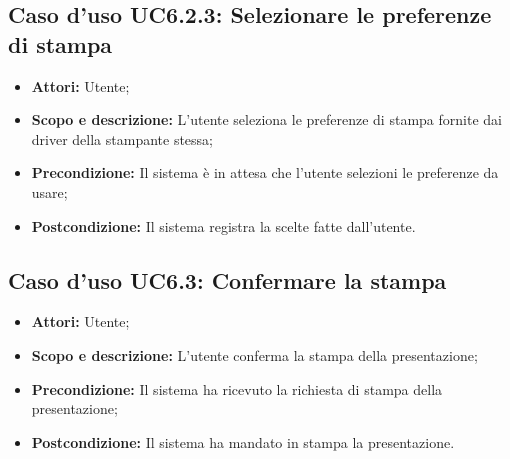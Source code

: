 	\subsection{Caso d'uso UC6.2.3: Selezionare le preferenze di stampa}
	\begin{itemize}
		\item \textbf{Attori:} Utente;
		\item \textbf{Scopo e descrizione:} L'utente seleziona le preferenze di stampa fornite dai driver della stampante stessa;
		\item \textbf{Precondizione:} Il sistema è in attesa che l'utente selezioni le preferenze da usare;
		\item \textbf{Postcondizione:} Il sistema registra la scelte fatte dall'utente.
	\end{itemize}


\subsection{Caso d'uso UC6.3: Confermare la stampa}
\begin{itemize}
	\item \textbf{Attori:} Utente;
	\item \textbf{Scopo e descrizione:} L'utente conferma la stampa della presentazione;
	\item \textbf{Precondizione:} Il sistema ha ricevuto la richiesta di stampa della presentazione;
	\item \textbf{Postcondizione:} Il sistema ha mandato in stampa la presentazione.
\end{itemize}

\newpage